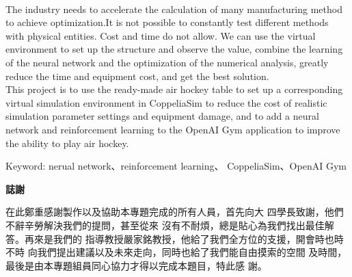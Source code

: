 \documentclass[14pt,a4paper]{report}  %
\begin{document}
\renewcommand{\baselinestretch}{1.5} %
\begin{center}
\LARGE\textbf{}\\
\begin{flushleft}
\fontsize{14pt}{14.5pt}\selectfont\hspace{12pt} \sectionef The industry needs to accelerate the calculation of many manufacturing method to achieve optimization.It is not possible to constantly test different methods with physical entities. Cost and time do not allow. We can use the virtual environment to set up the structure and observe the value, combine the learning of the neural network and the optimization of the numerical analysis, greatly reduce the time and equipment cost, and get the best solution.\\

\hspace{12pt} This project is to use the ready-made air hockey table to set up a corresponding virtual simulation environment in CoppeliaSim to reduce the cost of realistic simulation parameter settings and equipment damage, and to add a neural network and reinforcement learning to the OpenAI Gym application to improve the ability to play air hockey.
\end{flushleft}
\begin{center}
\fontsize{14pt}{14.5pt}\selectfont\sectionef Keyword:  nerual network、reinforcement learning、 CoppeliaSim、OpenAI Gym
\end{center}
\newpage
\centerline\LARGE\textbf{誌謝}\\
\begin{flushleft}
\fontsize{14pt}{2.5pt}\hspace{12pt}在此鄭重感謝製作以及協助本專題完成的所有人員，首先向大
四學長致謝，他們不辭辛勞解決我們的提問，甚至從來
沒有不耐煩，總是貼心為我們找出最佳解答。再來是我們的
指導教授嚴家銘教授，他給了我們全方位的支援，開會時也時不時
向我們提出建議以及未來走向，同時也給了我們能自由摸索的空間
及時間，最後是由本專題組員同心協力才得以完成本題目，特此感
謝。
\end{flushleft}
\newpage
\renewcommand{\contentsname}{\centerline{\fontsize{18pt}{\baselineskip}\selectfont\textbf{目\quad 錄}}}
\tableofcontents　　%
\newpage
\renewcommand{\listfigurename}{\centerline{\fontsize{18pt}{\baselineskip}\selectfont\textbf{圖\quad 表\quad 目\quad 錄 }}}
\listoffigures
\newcommand{\captioname}{圖}
\newpage
\end{center}
\end{document}
